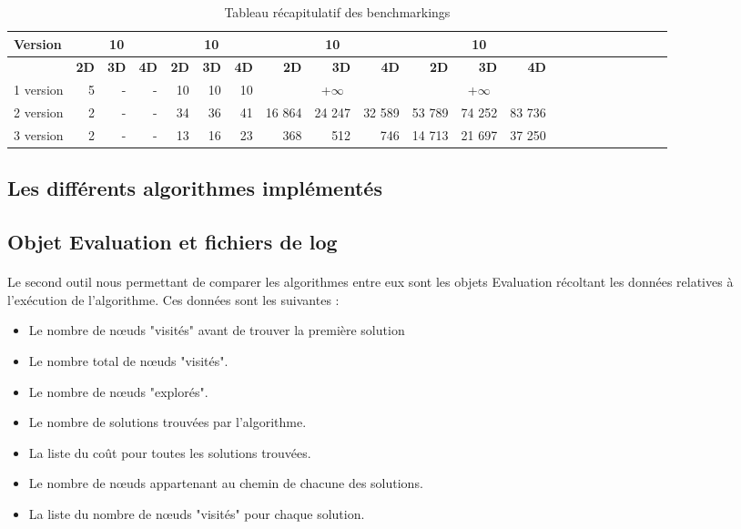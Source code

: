 \documentclass[pidr]{tnreport}
\begin{document}
\begin{table}[h]
\begin{center}
   \begin{tabular}{| l | r | r | r | r | r | r | r | r | r | r | r | r | r | r | r | r | r | r | r | r | r |}
     \hline
      \textbf{Version} & \multicolumn{3}{c|}{\textbf{10\up{2}}} & \multicolumn{3}{c|}{\textbf{10\up{4}}} & \multicolumn{3}{c|}{\textbf{10\up{6}}} & \multicolumn{3}{c|}{\textbf{10\up{7}}} \\
     \hline
     \cline{2-5}
    & \textbf{2D} & \textbf{3D} & \textbf{4D} & \textbf{2D} & \textbf{3D} & \textbf{4D} & \textbf{2D} & \textbf{3D} & \textbf{4D} & \textbf{2D} & \textbf{3D} & \textbf{4D}\\ \hline
     1\up{ère} version & 5 & - & - & ~10\up{7} & ~10\up{8} & ~10\up{8} & \multicolumn{3}{c|}{+$\infty$}  & \multicolumn{3}{c|}{+$\infty$}   \\ \hline
     2\up{ème} version & 2 & - & - & 34 & 36 & 41 & 16 864 & 24 247 & 32 589 & 53 789 & 74 252 & 83 736  \\ \hline
     3\up{ème} version & 2 & - & - & 13 & 16 & 23 & 368 & 512 & 746  & 14 713 & 21 697 & 37 250 \\ \hline
   \end{tabular}
 \end{center}
 \caption{Tableau récapitulatif des benchmarkings}
\end{table}

	\subsection{Les différents algorithmes implémentés}
	
		\subsection{Objet Evaluation et fichiers de log}
\paragraph{}
Le second outil nous permettant de comparer les algorithmes entre eux sont les objets Evaluation récoltant les données relatives à l'exécution de l'algorithme. Ces données sont les suivantes :

\begin{itemize}
	
	\item Le nombre de nœuds "visités" avant de trouver la première solution
	\item Le nombre total de nœuds "visités".
	\item Le nombre de nœuds "explorés".
	\item Le nombre de solutions trouvées par l'algorithme.
	\item La liste du coût pour toutes les solutions trouvées.
	\item Le nombre de nœuds appartenant au chemin de chacune des solutions.
	\item La liste du nombre de nœuds "visités" pour chaque solution.

\end{itemize}
\end{document}
